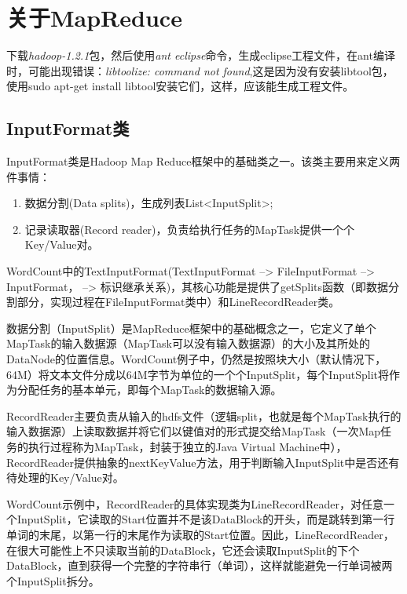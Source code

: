 \section{关于MapReduce}
\par 下载\textsl{hadoop-1.2.1}包，然后使用\textsl{ant eclipse}命令，生成eclipse工程文件，在ant编译时，可能出现错误：\textsl{libtoolize: command not found},这是因为没有安装libtool包，使用\textsf{sudo apt-get install libtool}安装它们，这样，应该能生成工程文件。
\subsection{InputFormat类}
\par InputFormat类是Hadoop Map Reduce框架中的基础类之一。该类主要用来定义两件事情：
\begin{enumerate}[(1)]
\item 数据分割(Data splits)，生成列表List<InputSplit>;
\item 记录读取器(Record reader)，负责给执行任务的MapTask提供一个个Key/Value对。
\end{enumerate}
\par WordCount中的TextInputFormat(TextInputFormat --> FileInputFormat --> InputFormat， --> 标识继承关系)，其核心功能是提供了getSplits函数（即数据分割部分，实现过程在FileInputFormat类中）和LineRecordReader类。
\par 数据分割（InputSplit）是MapReduce框架中的基础概念之一，它定义了单个MapTask的输入数据源（MapTask可以没有输入数据源）的大小及其所处的DataNode的位置信息。WordCount例子中，仍然是按照块大小（默认情况下，64M）将文本文件分成以64M字节为单位的一个个InputSplit，每个InputSplit将作为分配任务的基本单元，即每个MapTask的数据输入源。
\par RecordReader主要负责从输入的hdfs文件（逻辑split，也就是每个MapTask执行的输入数据源）上读取数据并将它们以键值对的形式提交给MapTask（一次Map任务的执行过程称为MapTask，封装于独立的Java Virtual Machine中），RecordReader提供抽象的nextKeyValue方法，用于判断输入InputSplit中是否还有待处理的Key/Value对。
\par WordCount示例中，RecordReader的具体实现类为LineRecordReader，对任意一个InputSplit，它读取的Start位置并不是该DataBlock的开头，而是跳转到第一行单词的末尾，以第一行的末尾作为读取的Start位置。因此，LineRecordReader，在很大可能性上不只读取当前的DataBlock，它还会读取InputSplit的下个DataBlock，直到获得一个完整的字符串行（单词），这样就能避免一行单词被两个InputSplit拆分。

